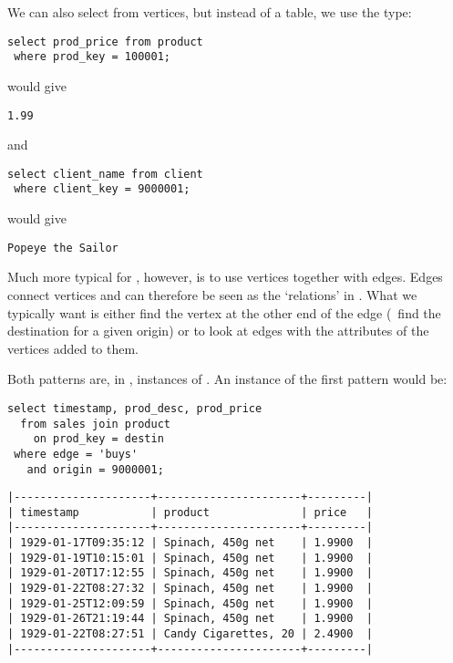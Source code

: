We can also select from vertices,
but instead of a table, we use the type:

\begin{sqlcode}
\begin{lstlisting}
select prod_price from product
 where prod_key = 100001;
\end{lstlisting}
\end{sqlcode}

would give
\begin{verbatim}
1.99
\end{verbatim}

and

\begin{sqlcode}
\begin{lstlisting}
select client_name from client
 where client_key = 9000001;
\end{lstlisting}
\end{sqlcode}

would give
\begin{verbatim}
Popeye the Sailor
\end{verbatim}


Much more typical for \nowdb, however,
is to use vertices together with edges. Edges connect vertices
and can therefore be seen as the `relations' in \nowdb.
What we typically want is either find the vertex
at the other end of the edge (\eg\ find the destination
for a given origin) or to look at edges with the attributes
of the vertices added to them.

Both patterns are, in \sql, instances of .
An instance of the first pattern would be:

\begin{sqlcode}
\begin{lstlisting}
select timestamp, prod_desc, prod_price
  from sales join product
    on prod_key = destin
 where edge = 'buys'
   and origin = 9000001;
\end{lstlisting}
\end{sqlcode}

\begin{verbatim}
|---------------------+----------------------+---------|
| timestamp           | product              | price   |
|---------------------+----------------------+---------|
| 1929-01-17T09:35:12 | Spinach, 450g net    | 1.9900  |
| 1929-01-19T10:15:01 | Spinach, 450g net    | 1.9900  |
| 1929-01-20T17:12:55 | Spinach, 450g net    | 1.9900  |
| 1929-01-22T08:27:32 | Spinach, 450g net    | 1.9900  |
| 1929-01-25T12:09:59 | Spinach, 450g net    | 1.9900  |
| 1929-01-26T21:19:44 | Spinach, 450g net    | 1.9900  |
| 1929-01-22T08:27:51 | Candy Cigarettes, 20 | 2.4900  |
|---------------------+----------------------+---------|
\end{verbatim}

